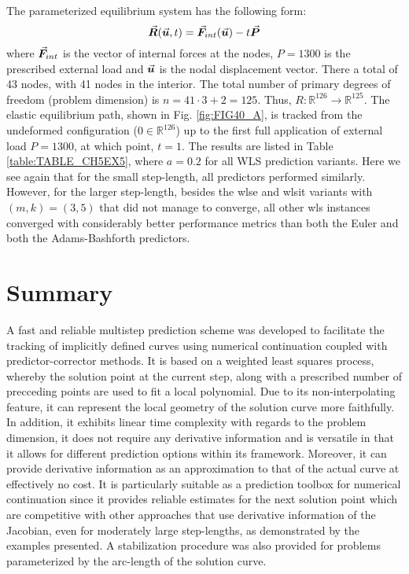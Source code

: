 \clearpage
 The 
parameterized 
equilibrium system has the following form:
\begin{equation}
	\vec{\bm{R}}(\vec{\bm{u}},t)=\vec{\bm{F}}_{int}(\vec{\bm{u}})-t \vec{\bm{P}}
	\label{eq:P4}
\end{equation}
where $\vec{\bm{F}}_{int}$ is the vector of internal forces at the nodes, $P=1300$ 
is the
prescribed external load and $\vec{\bm{u}}$ is the nodal
displacement vector. There a total of 43 nodes, with 41 nodes in the interior. 
The total number of primary degrees of
freedom (problem dimension) is $n=41\cdot 3+2=125$. Thus,
$R:\mathbb{R}^{126}\rightarrow\mathbb{R}^{125}$. The elastic equilibrium path, 
shown in 
Fig. \ref{fig:FIG40_A}, is tracked from
the undeformed configuration ($0\in\mathbb{R}^{126}$) up to the first full 
application of external load $P=1300$, at which point, $t=1$. The results are
listed in Table \ref{table:TABLE_CH5EX5}, where $a=0.2$ for all WLS prediction 
variants. Here we see again that for the small step-length, all predictors 
performed similarly. However, for the larger step-length, besides the 
\acrshort{wlse} and \acrshort{wlsit} variants with $(m,k)=(3,5)$ that did not 
manage to converge, all other \acrshort{wls} instances converged with 
considerably better performance metrics than both the Euler and both the 
Adams-Bashforth predictors. 


\section{Summary}

A fast and reliable multistep prediction scheme was developed to
facilitate the tracking of implicitly defined curves using numerical
continuation coupled with predictor-corrector methods. It is based
on a weighted least squares process, whereby the solution point at the current
step, along with a prescribed number of precceding points are used to fit a
local polynomial. Due to its non-interpolating feature, it can represent the 
local
geometry of the solution curve more faithfully. In addition, it exhibits linear
time complexity with regards to the problem dimension, it does not
require any derivative information and is versatile in
that it allows for different prediction options within its framework. Moreover,
it can provide derivative information as an approximation to that of the actual 
curve at effectively no cost. It is particularly suitable as a prediction
toolbox for numerical continuation since it provides reliable estimates for the 
next
solution point which are competitive with other approaches that use derivative 
information of the Jacobian, even for moderately large step-lengths, as
demonstrated by the examples presented. A
stabilization procedure was also provided for problems parameterized by the 
arc-length of the solution curve.  

